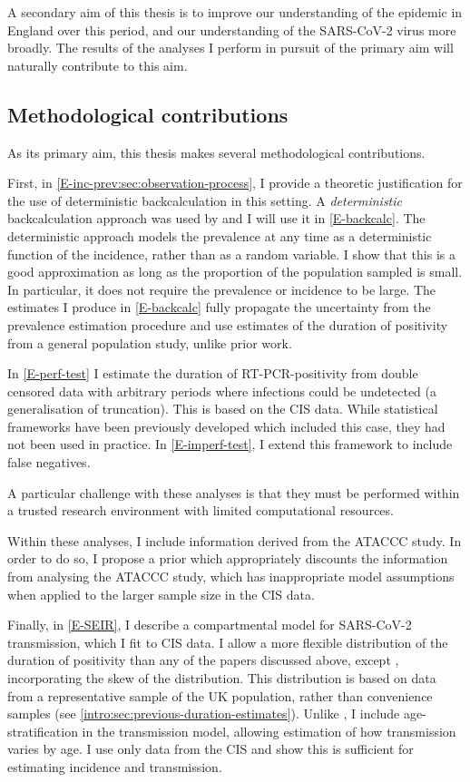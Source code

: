 \documentclass[thesis.tex]{subfiles}
\begin{document}
A secondary aim of this thesis is to improve our understanding of the epidemic in England over this period, and our understanding of the SARS-CoV-2 virus more broadly.
The results of the analyses I perform in pursuit of the primary aim will naturally contribute to this aim.

\subsection{Methodological contributions}

As its primary aim, this thesis makes several methodological contributions.

First, in \cref{E-inc-prev:sec:observation-process}, I provide a theoretic justification for the use of deterministic backcalculation in this setting.
A \emph{deterministic} backcalculation approach was used by \textcite{abbottCISincidence} and I will use it in \cref{E-backcalc}.
The deterministic approach models the prevalence at any time as a deterministic function of the incidence, rather than as a random variable.
I show that this is a good approximation as long as the proportion of the population sampled is small.
In particular, it does not require the prevalence or incidence to be large.
The estimates I produce in \cref{E-backcalc} fully propagate the uncertainty from the prevalence estimation procedure and use estimates of the duration of positivity from a general population study, unlike prior work.

In \cref{E-perf-test} I estimate the duration of RT-PCR-positivity from double censored data with arbitrary periods where infections could be undetected (a generalisation of truncation).
This is based on the CIS data.
While statistical frameworks have been previously developed which included this case, they had not been used in practice.
In \cref{E-imperf-test}, I extend this framework to include false negatives.

A particular challenge with these analyses is that they must be performed within a trusted research environment with limited computational resources.

Within these analyses, I include information derived from the ATACCC study.
In order to do so, I propose a prior which appropriately discounts the information from analysing the ATACCC study, which has inappropriate model assumptions when applied to the larger sample size in the CIS data.


Finally, in \cref{E-SEIR}, I describe a compartmental model for SARS-CoV-2 transmission, which I fit to CIS data.
I allow a more flexible distribution of the duration of positivity than any of the papers discussed above, except \textcite{nicholsonImproving}, incorporating the skew of the distribution.
This distribution is based on data from a representative sample of the UK population, rather than convenience samples (see \cref{intro:sec:previous-duration-estimates}).
Unlike \textcite{nicholsonImproving}, I include age-stratification in the transmission model, allowing estimation of how transmission varies by age.
I use only data from the CIS and show this is sufficient for estimating incidence and transmission.
\end{document}
